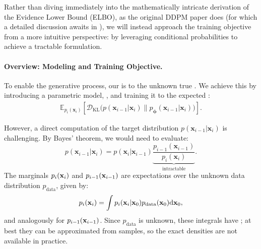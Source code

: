 Rather than diving immediately into the mathematically intricate derivation of the Evidence Lower Bound (ELBO), as the original DDPM paper does (for which a detailed discussion awaits in ), we will instead approach the training objective from a more intuitive perspective: by leveraging conditional probabilities to achieve a tractable formulation. 


\paragraph{Overview: Modeling and Training Objective.} 
To enable the generative process, our  is to  the unknown true . We achieve this by introducing a  parametric model, , and training it to  the expected :
\begin{align}\label{eq:marginal-kl-matching}
    \mathbb{E}_{p_i(\mathbf{x}_i)} \left[
    \mathcal{D}_{\mathrm{KL}}\big(p(\mathbf{x}_{i-1}|\mathbf{x}_i) \| p_{\bm{\phi}}(\mathbf{x}_{i-1}|\mathbf{x}_i)\big)
    \right].
\end{align}

However, a direct computation of the target distribution $p(\mathbf{x}_{i-1}|\mathbf{x}_i)$ is challenging. By Bayes' theorem, we would need to evaluate:
\[
p(\mathbf{x}_{i-1}|\mathbf{x}_i) = p(\mathbf{x}_i|\mathbf{x}_{i-1}) \underbrace{\frac{p_{i-1}(\mathbf{x}_{i-1})}{p_i(\mathbf{x}_i)}}_{\text{intractable}}.
\]
The marginals $p_i({\mathbf{x}}_i)$ and $p_{i-1}({\mathbf{x}}_{i-1})$ are expectations over the unknown data distribution $p_{\mathrm{data}}$, given by:
\[
p_i({\mathbf{x}}_i) = \int p_i({\mathbf{x}}_i | {\mathbf{x}}_0) p_{\mathrm{data}}({\mathbf{x}}_0) \mathrm{d}{\mathbf{x}}_0,
\]
and analogously for $p_{i-1}({\mathbf{x}}_{i-1})$. Since $p_{\mathrm{data}}$ is unknown, these integrals have ; at best they can be approximated from samples, so the exact densities are not available in practice.

